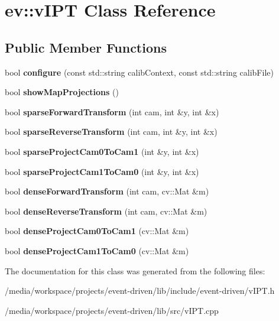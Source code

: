 \hypertarget{classev_1_1vIPT}{}\section{ev\+:\+:v\+I\+PT Class Reference}
\label{classev_1_1vIPT}
\subsection*{Public Member Functions}
\begin{DoxyCompactItemize}
\item 
\mbox{\label{classev_1_1vIPT_a6a2589f1cf91d6ec3438b0ecdfee84f6}} 
bool {\bfseries configure} (const std\+::string calib\+Context, const std\+::string calib\+File)
\item 
\mbox{\label{classev_1_1vIPT_a28592ad4e46dd58777e34e963a1bd932}} 
bool {\bfseries show\+Map\+Projections} ()
\item 
\mbox{\label{classev_1_1vIPT_ab607f86eec5f5147d5940293c298ac87}} 
bool {\bfseries sparse\+Forward\+Transform} (int cam, int \&y, int \&x)
\item 
\mbox{\label{classev_1_1vIPT_af75a5bb46e8a8c17146a00cd38530c83}} 
bool {\bfseries sparse\+Reverse\+Transform} (int cam, int \&y, int \&x)
\item 
\mbox{\label{classev_1_1vIPT_a70d19f6494aba2f6a16f057cd53ca659}} 
bool {\bfseries sparse\+Project\+Cam0\+To\+Cam1} (int \&y, int \&x)
\item 
\mbox{\label{classev_1_1vIPT_a8d87fce16f963ac875c65cc21643ada5}} 
bool {\bfseries sparse\+Project\+Cam1\+To\+Cam0} (int \&y, int \&x)
\item 
\mbox{\label{classev_1_1vIPT_aeea8f19d5e518a6f5c4b183ac9b77f8d}} 
bool {\bfseries dense\+Forward\+Transform} (int cam, cv\+::\+Mat \&m)
\item 
\mbox{\label{classev_1_1vIPT_aa783cdb93de9493965ee07a66aade258}} 
bool {\bfseries dense\+Reverse\+Transform} (int cam, cv\+::\+Mat \&m)
\item 
\mbox{\label{classev_1_1vIPT_ace6abc6a89c59e3b330abac1d02703f1}} 
bool {\bfseries dense\+Project\+Cam0\+To\+Cam1} (cv\+::\+Mat \&m)
\item 
\mbox{\label{classev_1_1vIPT_ae17ef6d577f0aab01ac19bbe39046bf9}} 
bool {\bfseries dense\+Project\+Cam1\+To\+Cam0} (cv\+::\+Mat \&m)
\end{DoxyCompactItemize}


The documentation for this class was generated from the following files\+:\begin{DoxyCompactItemize}
\item 
/media/workspace/projects/event-\/driven/lib/include/event-\/driven/v\+I\+P\+T.\+h\item 
/media/workspace/projects/event-\/driven/lib/src/v\+I\+P\+T.\+cpp\end{DoxyCompactItemize}

